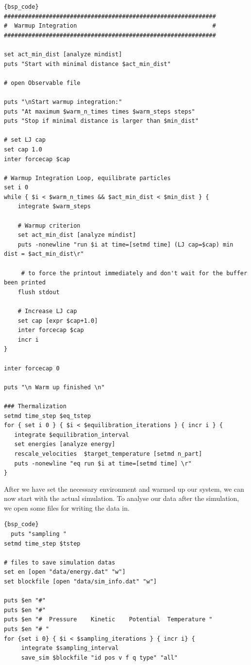 \documentclass[
paper=a4,                       %
fontsize=11pt,                  %
twoside,                        %
footsepline,                    %
headsepline,                    %
headinclude=false,              %
footinclude=false,              %
pagesize,                       %
]{scrartcl}
\begin{document}
{\small\vspace{0,2cm}
\begin{lstlisting}[firstnumber=auto]{bsp_code}
#############################################################
#  Warmup Integration                                       #
#############################################################

set act_min_dist [analyze mindist]
puts "Start with minimal distance $act_min_dist"

# open Observable file

puts "\nStart warmup integration:"
puts "At maximum $warm_n_times times $warm_steps steps"
puts "Stop if minimal distance is larger than $min_dist"

# set LJ cap
set cap 1.0
inter forcecap $cap

# Warmup Integration Loop, equilibrate particles
set i 0
while { $i < $warm_n_times && $act_min_dist < $min_dist } {
    integrate $warm_steps

    # Warmup criterion
    set act_min_dist [analyze mindist]
    puts -nonewline "run $i at time=[setmd time] (LJ cap=$cap) min dist = $act_min_dist\r"
    
     # to force the printout immediately and don't wait for the buffer been printed
    flush stdout

    # Increase LJ cap
    set cap [expr $cap+1.0]
    inter forcecap $cap
    incr i
}

inter forcecap 0

puts "\n Warm up finished \n"

### Thermalization 
setmd time_step $eq_tstep
for { set i 0 } { $i < $equilibration_iterations } { incr i } {
   integrate $equilibration_interval
   set energies [analyze energy]
   rescale_velocities  $target_temperature [setmd n_part]
   puts -nonewline "eq run $i at time=[setmd time] \r"
}

\end{lstlisting}}\vspace{0,2cm}

\noindent After we have set the necessary environment and warmed up our system, we can now start with the actual 
simulation. To analyse our data after the simulation, we open some files for writing the data in. 

{\small\vspace{0,2cm}
\begin{lstlisting}[firstnumber=auto]{bsp_code}
  puts "sampling "
setmd time_step $tstep

# files to save simulation datas
set en [open "data/energy.dat" "w"]
set blockfile [open "data/sim_info.dat" "w"]

puts $en "#"
puts $en "#"
puts $en "#  Pressure    Kinetic    Potential  Temperature "
puts $en "# "
for {set i 0} { $i < $sampling_iterations } { incr i} {
     integrate $sampling_interval
     save_sim $blockfile "id pos v f q type" "all"
\end{lstlisting}}\vspace{0,2cm}
\end{document}

